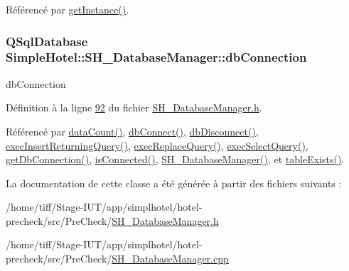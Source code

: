 Référencé par \hyperlink{classSimpleHotel_1_1SH__DatabaseManager_a0bcee98b94b5144e4c066000c4ae3321}{get\-Instance()}.

\hypertarget{classSimpleHotel_1_1SH__DatabaseManager_a01130ad218e0a00e80f53c4894996d19}{
\subsubsection[{db\-Connection}]{\setlength{\rightskip}{0pt plus 5cm}Q\-Sql\-Database Simple\-Hotel\-::\-S\-H\-\_\-\-Database\-Manager\-::db\-Connection\hspace{0.3cm}{\ttfamily [protected]}}}\label{classSimpleHotel_1_1SH__DatabaseManager_a01130ad218e0a00e80f53c4894996d19}


db\-Connection 



Définition à la ligne \hyperlink{SH__DatabaseManager_8h_source_l00092}{92} du fichier \hyperlink{SH__DatabaseManager_8h_source}{S\-H\-\_\-\-Database\-Manager.\-h}.



Référencé par \hyperlink{classSimpleHotel_1_1SH__DatabaseManager_a4d230dd386411933e365a5889f0a6032}{data\-Count()}, \hyperlink{classSimpleHotel_1_1SH__DatabaseManager_a5706c91e422a3345bfd832f14132846c}{db\-Connect()}, \hyperlink{classSimpleHotel_1_1SH__DatabaseManager_af0bb6ce6d7001b304f7a8a94d4085d50}{db\-Disconnect()}, \hyperlink{classSimpleHotel_1_1SH__DatabaseManager_af6d035d5bd2f252bc94733bea3dfbc48}{exec\-Insert\-Returning\-Query()}, \hyperlink{classSimpleHotel_1_1SH__DatabaseManager_a77fad7ef6701bedf21805047c986ba95}{exec\-Replace\-Query()}, \hyperlink{classSimpleHotel_1_1SH__DatabaseManager_ade052bd4f0e6aa490becef78ce4ea4d7}{exec\-Select\-Query()}, \hyperlink{classSimpleHotel_1_1SH__DatabaseManager_a2cfbc7151c22c7330efe938d7951ae47}{get\-Db\-Connection()}, \hyperlink{classSimpleHotel_1_1SH__DatabaseManager_ab0efad012b5ae548359b2e9f8392d9a0}{is\-Connected()}, \hyperlink{classSimpleHotel_1_1SH__DatabaseManager_ade00a085fdf7207d67476179e179d03d}{S\-H\-\_\-\-Database\-Manager()}, et \hyperlink{classSimpleHotel_1_1SH__DatabaseManager_a846c82ab4c7ce5bda375cc7348564c75}{table\-Exists()}.



La documentation de cette classe a été générée à partir des fichiers suivants \-:\begin{DoxyCompactItemize}
\item 
/home/tiff/\-Stage-\/\-I\-U\-T/app/simplhotel/hotel-\/precheck/src/\-Pre\-Check/\hyperlink{SH__DatabaseManager_8h}{S\-H\-\_\-\-Database\-Manager.\-h}\item 
/home/tiff/\-Stage-\/\-I\-U\-T/app/simplhotel/hotel-\/precheck/src/\-Pre\-Check/\hyperlink{SH__DatabaseManager_8cpp}{S\-H\-\_\-\-Database\-Manager.\-cpp}\end{DoxyCompactItemize}
